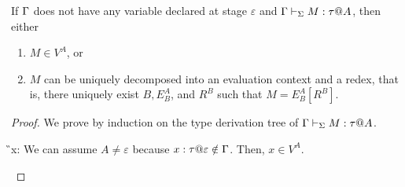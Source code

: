 \begin{lemma}
    If $\Gamma$ does not have any variable declared at stage $\varepsilon$
    and $\Gamma \vdash_\Sigma M : \tau @ A$, then either
    \begin{enumerate}
        \item $ M \in V^A$, or
        \item $M$ can be uniquely decomposed into an evaluation context and a redex, that is, there uniquely exist $B, E^A_B$, and $R^B$ such that $M = E^A_B[R^B]$.
    \end{enumerate}
\end{lemma}

\begin{proof}
    {
        We prove by induction on the type derivation tree of $\G \V M:\tau@A$.

        \begin{rneqncase}{\TVar{}}{
                \G\V x:\tau@A {}
            }
            We can assume $A \neq \varepsilon$ because $x:\tau@\varepsilon \notin \G$.
            Then, $x \in V^A$.
        \end{rneqncase}

}
\end{proof}
